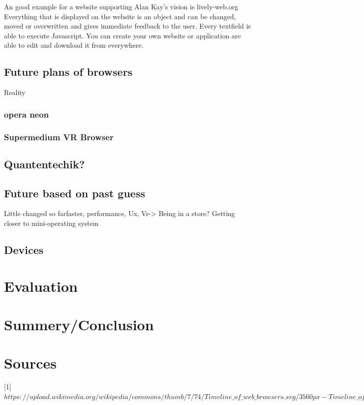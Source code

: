 \documentclass[runningheads]{llncs}
\begin{document}
		An good example for a website supporting Alan Kay's vision is lively-web.org
		Everything that is displayed on the website is an object and can be changed, moved or overwritten and gives immediate feedback to the user. Every textfield is able to execute Javascript. You can create your own website or application are able to edit and download it from everywhere.
		\subsection{Future plans of browsers}
		 Reality
		\subsubsection{opera neon}
		\subsubsection{Supermedium VR Browser}
		\subsection{Quantentechik?}
		\subsection{Future based on past guess}
		Little changed so farfaster, performance, Ux, Vr-> Being in a store? Getting closer to mini-operating system
		\subsection{Devices}

	\section{Evaluation}

	\section{Summery/Conclusion}
	\section{Sources}
	[1] $https://upload.wikimedia.org/wikipedia/commons/thumb/7/74/Timeline\_of\_web\_browsers.svg/3560px-Timeline\_of\_web\_browsers.svg.png$
\end{document}
